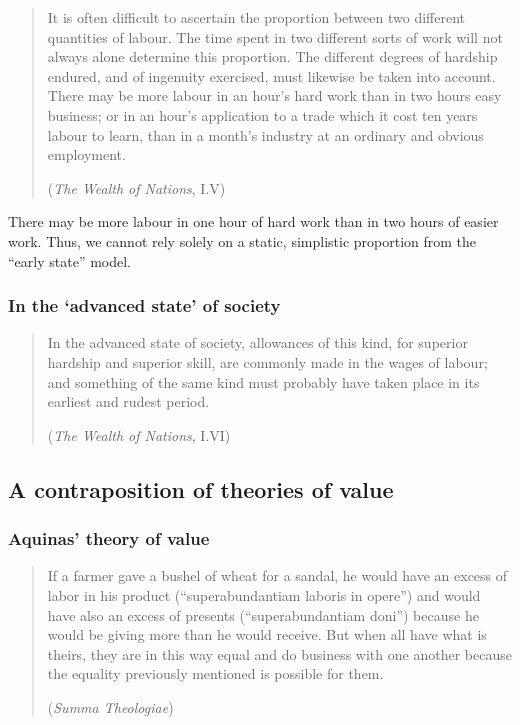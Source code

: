 \begin{quote}
It is often difficult to ascertain the proportion between two different quantities of labour. The time spent in two different sorts of work will not always alone determine this proportion. The different degrees of hardship endured, and of ingenuity exercised, must likewise be taken into account. There may be more labour in an hour’s hard work than in two hours easy business; or in an hour’s application to a trade which it cost ten years labour to learn, than in a month’s industry at an ordinary and obvious employment.

(\textit{The Wealth of Nations}, I.V)
\end{quote}

\begin{remark}
There may be more labour in one hour of hard work than in two hours of easier work. Thus, we cannot rely solely on a static, simplistic proportion from the “early state” model.
\end{remark}

\subsubsection{In the ‘advanced state’ of society}

\begin{quote}
In the advanced state of society, allowances of this kind, for superior hardship and superior skill, are commonly made in the wages of labour; and something of the same kind must probably have taken place in its earliest and rudest period.

(\textit{The Wealth of Nations}, I.VI)
\end{quote}

\subsection{A contraposition of theories of value}

\subsubsection{Aquinas’ theory of value}

\begin{quote}
If a farmer gave a bushel of wheat for a sandal, he would have an excess of labor in his product (“superabundantiam laboris in opere”) and would have also an excess of presents (“superabundantiam doni”) because he would be giving more than he would receive. But when all have what is theirs, they are in this way equal and do business with one another because the equality previously mentioned is possible for them.

(\textit{Summa Theologiae})
\end{quote}

